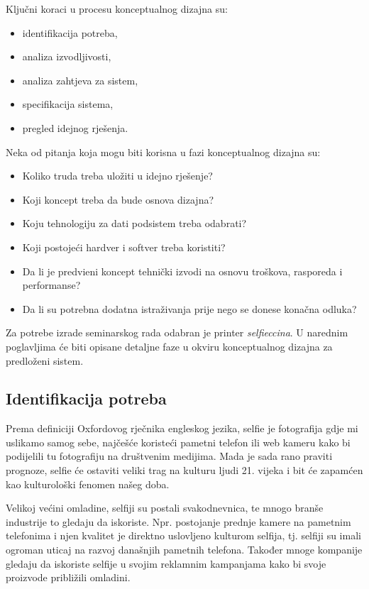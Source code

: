 \documentclass[12pt]{article}
\begin{document}
Klju\v{c}ni koraci u procesu konceptualnog dizajna su:
\begin{itemize}
\item identifikacija potreba,
\item analiza izvodljivosti,
\item analiza zahtjeva za sistem,
\item specifikacija sistema,
\item pregled idejnog rje\v{s}enja. %
\end{itemize}

Neka od pitanja koja mogu biti korisna u fazi konceptualnog dizajna su:
\begin{itemize}
\item Koliko truda treba ulo\v{z}iti u idejno rje\v{s}enje?
\item Koji koncept treba da bude osnova dizajna? 
\item Koju tehnologiju za dati podsistem treba odabrati?
\item Koji postoje\'ci hardver i softver treba koristiti?
\item Da li je predvi\dj eni koncept tehni\v{c}ki izvodi na osnovu tro\v{s}kova, rasporeda i performanse?
\item Da li su potrebna dodatna istra\v{z}ivanja prije nego se donese kona\v{c}na odluka? %
\end{itemize}

Za potrebe izrade seminarskog rada odabran je printer \textit{selfieccina}. U narednim poglavljima će biti opisane detaljne faze u okviru konceptualnog dizajna za predloženi sistem.

\subsection{Identifikacija potreba}

Prema definiciji Oxfordovog rječnika engleskog jezika, selfie je fotografija gdje mi uslikamo samog sebe, najčešće koristeći pametni telefon ili web kameru kako bi podijelili tu fotografiju na društvenim medijima. Mada je sada rano praviti prognoze, selfie će ostaviti veliki trag na kulturu ljudi 21. vijeka i bit će zapamćen kao kulturološki fenomen našeg doba. 

Velikoj većini omladine, selfiji su postali svakodnevnica, te mnogo branše industrije to gledaju da iskoriste. Npr. postojanje prednje kamere na pametnim telefonima i njen kvalitet je direktno uslovljeno kulturom selfija, tj. selfiji su imali ogroman uticaj na razvoj današnjih pametnih telefona. Također mnoge kompanije gledaju da iskoriste selfije u svojim reklamnim kampanjama kako bi svoje proizvode približili omladini. 
\end{document}
